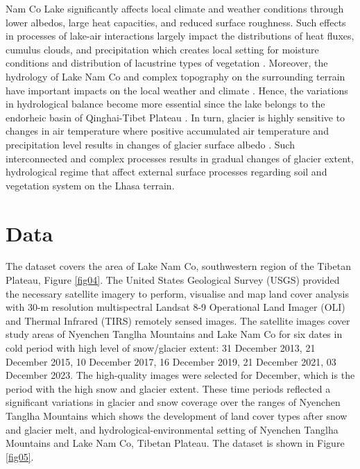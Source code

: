 \documentclass[final,5p,times,twocolumn]{elsarticle}
\begin{document}
Nam Co Lake significantly affects local climate and weather conditions through lower albedos, large heat capacities, and reduced surface roughness. Such effects in processes of lake-air interactions largely impact the distributions of heat fluxes, cumulus clouds, and precipitation which creates local setting for moisture conditions and distribution of lacustrine types of vegetation \cite{2018JD028330}. Moreover, the hydrology of Lake Nam Co and complex topography on the surrounding terrain have important impacts on the local weather and climate \cite{2021JD036190}. Hence, the variations in hydrological balance become more essential since the lake belongs to the endorheic basin of Qinghai-Tibet Plateau \cite{Zhuetal2010}. In turn, glacier is highly sensitive to changes in air temperature where positive accumulated air temperature and precipitation level results in changes of glacier surface albedo \cite{Zhouetal2010}. Such interconnected and complex processes results in gradual changes of glacier extent, hydrological regime that affect external surface processes regarding soil and vegetation system on the Lhasa terrain.

\section{Data}

The dataset covers the area of Lake Nam Co, southwestern region of the Tibetan Plateau, Figure \ref{fig04}. The United States Geological Survey (USGS) provided the necessary satellite imagery to perform, visualise and map land cover analysis with 30-m resolution multispectral Landsat 8-9 Operational Land Imager (OLI) and Thermal Infrared (TIRS) remotely sensed images. The satellite images cover study areas of Nyenchen Tanglha Mountains and Lake Nam Co for six dates in cold period with high level of snow/glacier extent: 31 December 2013, 21 December 2015, 10 December 2017, 16 December 2019, 21 December 2021, 03 December 2023. The high-quality images were selected for December, which is the period with the high snow and glacier extent. These time periods reflected a significant variations in glacier and snow coverage over the ranges of Nyenchen Tanglha Mountains which shows the development of land cover types after snow and glacier melt, and hydrological-environmental setting of Nyenchen Tanglha Mountains and Lake Nam Co, Tibetan Plateau. The dataset is shown in Figure \ref{fig05}.
\end{document}
